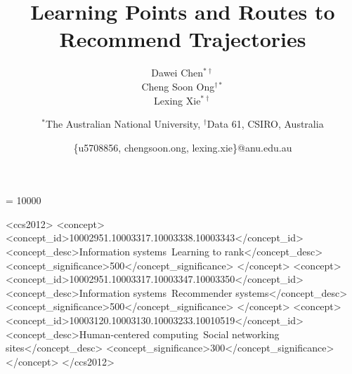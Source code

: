 \documentclass{sig-alternate-05-2015}
\begin{document}

\widowpenalty = 10000

\title{Learning Points and Routes to Recommend Trajectories}

\author{
    \alignauthor Dawei Chen$^{*\dagger}$\\
    \alignauthor Cheng Soon Ong$^{\dagger *}$\\
    \alignauthor Lexing Xie$^{*\dagger}$\\
    \and
    $^*$The Australian National University, $^\dagger$Data 61, CSIRO, Australia\\
    \and
    \{u5708856, chengsoon.ong, lexing.xie\}@anu.edu.au
}

\begin{CCSXML}
<ccs2012>
<concept>
<concept_id>10002951.10003317.10003338.10003343</concept_id>
<concept_desc>Information systems~Learning to rank</concept_desc>
<concept_significance>500</concept_significance>
</concept>
<concept>
<concept_id>10002951.10003317.10003347.10003350</concept_id>
<concept_desc>Information systems~Recommender systems</concept_desc>
<concept_significance>500</concept_significance>
</concept>
<concept>
<concept_id>10003120.10003130.10003233.10010519</concept_id>
<concept_desc>Human-centered computing~Social networking sites</concept_desc>
<concept_significance>300</concept_significance>
</concept>
</ccs2012>
\end{CCSXML}


\maketitle

\begin{abstract}

\end{abstract}
\end{document}
